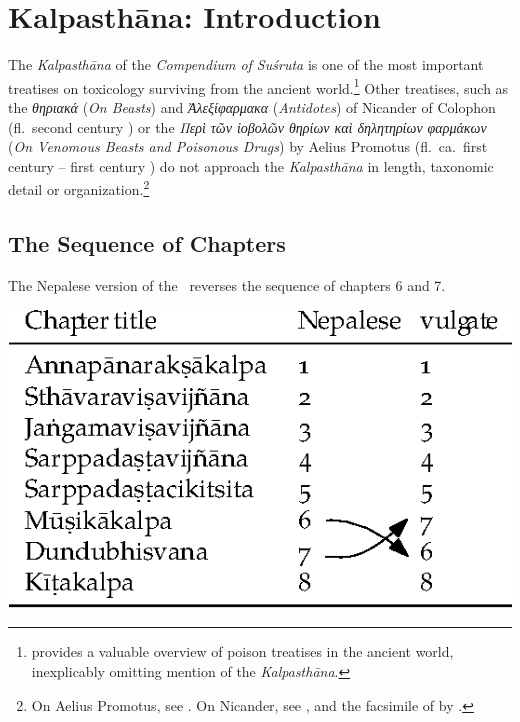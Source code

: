 \chapter{Kalpasthāna: Introduction}

The \emph{Kalpasthāna} of the \emph{Compendium of Suśruta} is one of the most
important treatises on toxicology surviving from the ancient 
world.\footnote{\citet{liu-2021} provides a valuable overview of poison treatises 
in the ancient world, inexplicably omitting mention of the \emph{Kalpasthāna}.} 
Other treatises, such as the
\emph{\textgreek{θηριακά}} (\emph{On Beasts}) and
\emph{\textgreek{Ἀλεξίφαρμακα}} (\emph{Antidotes}) 
of Nicander of Colophon (fl.\ second century \BCE)
or the  
\emph{\textgreek{Περὶ τῶν ἰοβολῶν θηρίων καὶ δηλητηρίων φαρμάκων}} 
(\emph{On Venomous Beasts and Poisonous Drugs})
by Aelius Promotus (fl.\ ca.\ first century \BCE -- first century \CE)
do not approach the \emph{Kalpasthāna} in length, taxonomic detail or
organization.\footnote{On Aelius Promotus, see 
\cites[29]{smit-1870}[363--368]{gost-1897}{ihm-1995}. On
    Nicander, see \cite{gow-1953}, and the facsimile of  by \citet{touw-1997}.}


\section{The Sequence of Chapters}
\label{kalpa-chapter-sequence}

The Nepalese version of the \SS\ reverses the sequence of chapters 6 and 7.  

\begin{table}[h]
    \centering
     \includegraphics[width=0.65\linewidth]{chapters/media/kalpa}
\end{table}

